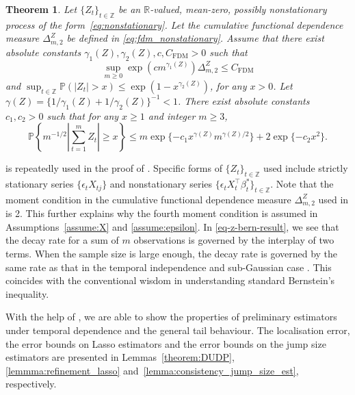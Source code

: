 \documentclass[11pt]{article}
\theoremstyle{plain}
\newtheorem{theorem}{Theorem}
\theoremstyle{definition}
\begin{document}
\begin{theorem}\label{thm:bernstein_exp_subExp_nonlinear}
Let $\{Z_t\}_{t \in \mathbb{Z}}$ be an $\mathbb{R}$-valued, mean-zero, possibly nonstationary process of the form~\eqref{eq:nonstationary}.  Let the cumulative functional dependence measure $\Delta^Z_{m,2}$ be defined in \eqref{eq:fdm_nonstationary}.  Assume that there exist absolute constants $\gamma_1(Z), \gamma_2(Z), c, C_{\mathrm{FDM}} > 0$ such that 
\begin{equation}\label{eq-z-bern-gamma-1}
    \sup_{m \geq 0}\exp(cm^{\gamma_1(Z)})\Delta^Z_{m,2} \leq C_{\mathrm{FDM}}    
\end{equation}
and $\sup_{t \in \mathbb{Z}}\mathbb{P}(|Z_t| > x ) \leq \exp(1 - x ^{\gamma_2(Z)})$, for any $x > 0$.  Let $\gamma(Z) = \{1/\gamma_1(Z) + 1/\gamma_2(Z)\}^{-1} < 1$. There exist absolute constants $c_1, c_2 > 0$ such that for any $x \ge 1$ and integer $m \geq 3$,
\begin{equation}\label{eq-z-bern-result}
    \mathbb{P}\left\{m^{-1/2}\left|\sum_{t = 1}^m Z_t\right| \geq x\right\} \leq m\exp\{- c_1 x^{\gamma(Z)} m^{\gamma(Z)/2}\} + 2\exp\{-c_2 x^2\}.
\end{equation}
\end{theorem} 

 is repeatedly used in the proof of .  Specific forms of $\{Z_t\}_{t \in \mathbb{Z}}$ used include strictly stationary series $\{\epsilon_tX_{tj}\}$ and nonstationary series $\{\epsilon_tX_t^{\top} \beta^*_t\}_{t \in \mathbb{Z}}$.  Note that the moment condition in the cumulative functional dependence measure $\Delta^Z_{m,2}$ used in  is 2.  This further explains why the fourth moment condition is assumed in Assumptions~\ref{assume:X} and \ref{assume:epsilon}.  In \eqref{eq-z-bern-result}, we see that the decay rate for a sum of $m$ observations is governed by the interplay of two terms.  When the sample size is large enough, the decay rate is governed by the same rate as that in the temporal independence and sub-Gaussian case \citep[e.g.][]{vershynin2018high}.  This coincides with the conventional wisdom in understanding standard Bernstein's inequality.


With the help of , we are able to show the properties of preliminary estimators under temporal dependence and the general tail behaviour.  The localisation error, the error bounds on Lasso estimators and the error bounds on the jump size estimators are presented in Lemmas~\ref{theorem:DUDP}, \ref{lemmma:refinement_lasso} and~\ref{lemma:consistency_jump_size_est}, respectively. 
\end{document}
